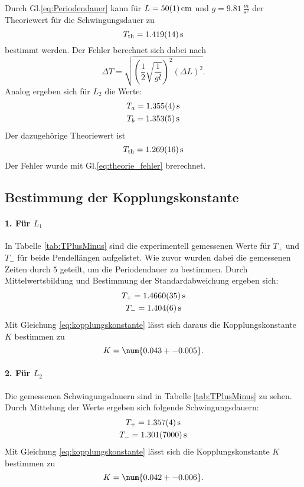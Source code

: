 \noindent Durch Gl.\eqref{eq:Periodendauer} kann für $L = \SI{50 +- 1}{cm} $ und $g = \SI{9.81}{\frac{m}{s^2}} $ der Theoriewert für die Schwingungsdauer zu
\begin{equation}
    T_\text{th} = \SI{1.419 +- 0.014}{s}
\end{equation}
bestimmt werden.
Der Fehler berechnet sich dabei nach
\begin{equation}
    \label{eq:theorie_fehler}
    \Delta T = \sqrt{ \left( \frac{1}{2} \sqrt{ \frac{1}{g l} } \right)^2 ( \Delta L)  ^2 } .
\end{equation}
Analog ergeben sich für $L_2$ die Werte:
\begin{gather}
    T_a = \SI{1.355 +- 0.004}{s} \\
    T_b = \SI{1.353 +- 0.005}{s}
\end{gather}
Der dazugehörige Theoriewert ist 
\begin{equation}
    T_\text{th} = \SI{1.269 +- 0.016}{s}
\end{equation}
Der Fehler wurde mit Gl.\eqref{eq:theorie_fehler} brerechnet.

\subsection{Bestimmung der Kopplungskonstante}
\label{sec:kopplung}

\paragraph{1. Für $L_1$}
In Tabelle \ref{tab:TPlusMinus} sind die experimentell gemessenen Werte für $T_+$ und $T_-$ für beide Pendellängen aufgelistet.
Wie zuvor wurden dabei die gemessenen Zeiten durch $5$ geteilt, um die Periodendauer zu bestimmen. Durch Mittelwertsbildung und Bestimmung der
Standardabweichung ergeben sich:
\begin{gather}
    T_+ = \SI{1.4660 +- 0.0035}{s} \\
    T_- = \SI{1.404 +- 0.006}{s}
\end{gather}
Mit Gleichung \eqref{eq:kopplungskonstante} lässt sich daraus die Kopplungskonstante $K$ bestimmen zu 
\begin{equation}
    K = \num{0.043 +- 0.005} .
\end{equation}

\paragraph{2. Für $L_2$}
Die gemessenen Schwingungsdauern sind in Tabelle \ref{tab:TPlusMinus} zu sehen. Durch Mittelung der Werte ergeben sich folgende Schwingungsdauern:
\begin{gather}
    T_+ = \SI{1.357 +- 0.004}{s} \\
    T_- = \SI{1.301 +- 007}{s}
\end{gather}
Mit Gleichung \eqref{eq:kopplungskonstante} lässt sich die Kopplungskonstante $K$ bestimmen zu
\begin{equation}
    K = \num{0.042 +- 0.006} .
\end{equation}


